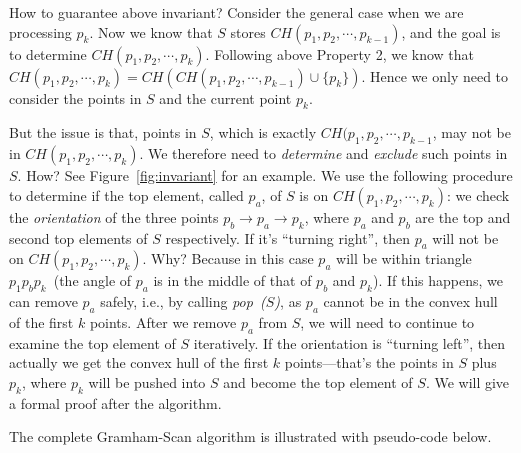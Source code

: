 How to guarantee above invariant? Consider the general case when we are processing $p_k$.
Now we know that $S$ stores $CH(p_1, p_2, \cdots, p_{k-1})$, and the goal is to determine $CH(p_1, p_2, \cdots, p_k)$.
Following above Property 2, we know that $CH(p_1, p_2, \cdots, p_k) = CH(CH(p_1, p_2, \cdots, p_{k-1}) \cup \{p_k\})$.
Hence we only need to consider the points in $S$ and the current point $p_k$.

But the issue is that, points in $S$, which is exactly $CH(p_1, p_2, \cdots, p_{k-1}$, may not be in
$CH(p_1, p_2, \cdots, p_k)$.  We therefore need to \emph{determine} and \emph{exclude} such points in $S$.
How? See Figure~\ref{fig:invariant} for an example.
We use the following procedure to determine if the top element, called $p_a$, of $S$ is on 
$CH(p_1, p_2, \cdots, p_k)$: we check the \emph{orientation} of the three points $p_b \to p_a \to p_k$,
where $p_a$ and $p_b$ are the top and second top elements of $S$ respectively.
If it's ``turning right'', then $p_a$ will not be on $CH(p_1, p_2, \cdots, p_k)$.
Why? Because in this case $p_a$ will be within triangle $p_1p_bp_k$~(the angle of $p_a$ is in the middle of that of $p_b$ and $p_k$).
If this happens, we can remove $p_a$ safely, i.e., by calling \emph{pop~($S$)}, as $p_a$ cannot be in the convex hull of the first $k$ points.
After we remove $p_a$ from $S$, we will need to continue to examine the top element of $S$ iteratively.
If the orientation is ``turning left'', then actually we get the convex hull of the first $k$ points---that's the points in $S$ plus $p_k$, where $p_k$ will be 
pushed into $S$ and become the top element of $S$. We will give a formal proof after the algorithm.



The complete Gramham-Scan algorithm is illustrated with pseudo-code below.

\begin{minipage}{0.8\textwidth}
	\xxx
	\xxx
	\xxx
	\xxx
	\xxx
	\xxx
\end{minipage}

\begin{minipage}{0.8\textwidth}
	\xxx
	\xxx
	\xxx
	\xxx
	\xxx
	\xxx
	\xxx
	\xxx
	\xxx
	\xxx
	\xxx
	\xxx
	\xxx
	\xxx
	\xxx
\end{minipage}

